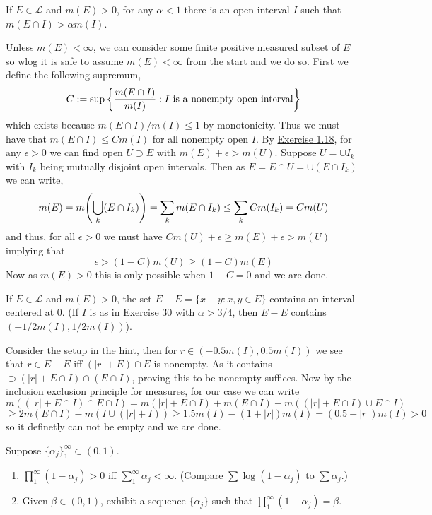 \documentclass[12pt,a4paper]{article}
\begin{document}
\begin{problem}\label{prob:1-30}
If $E \in \mathcal{L}$ and $m(E) > 0$, for any $\alpha < 1$ there is an open interval $I$ such that $m(E \cap I) > \alpha m(I)$.
\end{problem}
\begin{solution}
    Unless $m(E)<\infty$, we can consider some finite positive measured subset of $E$ so wlog it is safe to assume $m(E)<\infty$ from the start and we do so.
    First we define the following supremum, 
    $$C:=\sup\qty{\frac{m(E\cap I)}{m(I)}:I\text{ is a nonempty open interval}}$$
    which exists because $m(E\cap I)/m(I)\leq 1$ by monotonicity. 
    Thus we must have that $m(E\cap I)\leq Cm(I)$ for all nonempty open $I$.
    By \hyperref[prob:1-18]{Exercise 1.18}, for any $\epsilon>0$ we can find open $U\supset E$ with $m(E)+\epsilon>m(U)$.
    Suppose $U=\cup I_k$ with $I_k$ being mutually disjoint open intervals. 
    Then as $E=E\cap U=\cup(E\cap I_k)$ we can write,
    $$m(E)=m\qty(\bigcup_{k}(E\cap I_k))=\sum_{k}m(E\cap I_k)\leq\sum_{k}Cm(I_k)=Cm(U)$$
    and thus, for all $\epsilon>0$ we must have $Cm(U)+\epsilon\geq m(E)+\epsilon>m(U)$ implying that 
    $$\epsilon>(1-C)m(U)\geq(1-C)m(E)$$
    Now as $m(E)>0$ this is only possible when $1-C=0$ and we are done.
\end{solution}
\begin{problem}\label{prob:1-31}
If $E \in \mathcal{L}$ and $m(E) > 0$, the set $E - E = \{x - y : x, y \in E\}$ contains an interval centered at $0$. (If $I$ is as in Exercise 30 with $\alpha > 3/4$, then $E - E$ contains $(-1/2 m(I), 1/2 m(I))$).
\end{problem}
\begin{solution}
    Consider the setup in the hint, then for $r\in(-0.5m(I),0.5m(I))$ we see that $r\in E-E$ iff $(|r|+E)\cap E$ is nonempty. 
    As it contains $\supset (|r|+E\cap I)\cap(E\cap I)$, proving this to be nonempty suffices. 
    Now by the inclusion exclusion principle for measures, for our case we can write 
    $$m((|r|+E\cap I)\cap E\cap I)=m(|r|+E\cap I)+m(E\cap I)-m((|r|+E\cap I)\cup E\cap I)$$
    $$\geq 2m(E\cap I)-m(I\cup(|r|+I))\geq 1.5m(I)-(1+|r|)m(I)=(0.5-|r|)m(I)>0$$
    so it definetly can not be empty and we are done.
\end{solution}
\begin{problem}\label{prob:1-32}
Suppose $\{\alpha_j\}_1^\infty \subset (0, 1)$.
\begin{enumerate}[label=\alph*.]
    \item $\prod_1^\infty (1 - \alpha_j) > 0$ iff $\sum_1^\infty \alpha_j < \infty$. (Compare $\sum \log(1 - \alpha_j)$ to $\sum \alpha_j$.)
    \item Given $\beta \in (0, 1)$, exhibit a sequence $\{\alpha_j\}$ such that $\prod_1^\infty (1 - \alpha_j) = \beta$.
\end{enumerate}
\end{problem}
\end{document}
